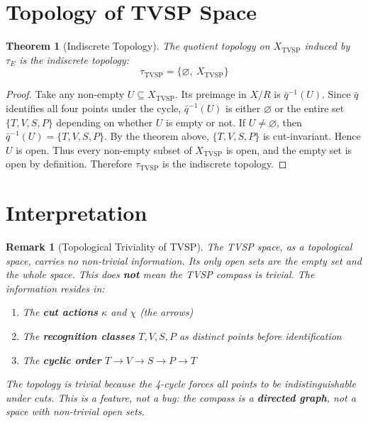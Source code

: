 \documentclass[12pt]{article}
\newtheorem{theorem}[axiom]{Theorem}
\newtheorem{remark}[axiom]{Remark}
\begin{document}
\section{Topology of TVSP Space}

\begin{theorem}[Indiscrete Topology]
The quotient topology on \(X_{\text{TVSP}}\) induced by \(\tau_E\) is the indiscrete topology:
\[
\tau_{\text{TVSP}} = \{ \varnothing,\ X_{\text{TVSP}} \}
\]
\end{theorem}

\begin{proof}
Take any non-empty \(U \subseteq X_{\text{TVSP}}\). Its preimage in \(X/R\) is \(\bar{q}^{-1}(U)\). Since \(\bar{q}\) identifies all four points under the cycle, \(\bar{q}^{-1}(U)\) is either \(\varnothing\) or the entire set \(\{T, V, S, P\}\) depending on whether \(U\) is empty or not.
If \(U \neq \varnothing\), then \(\bar{q}^{-1}(U) = \{T, V, S, P\}\).
By the theorem above, \(\{T, V, S, P\}\) is cut-invariant.
Hence \(U\) is open.
Thus every non-empty subset of \(X_{\text{TVSP}}\) is open, and the empty set is open by definition.
Therefore \(\tau_{\text{TVSP}}\) is the indiscrete topology.
\end{proof}

\section{Interpretation}

\begin{remark}[Topological Triviality of TVSP]
The TVSP space, as a topological space, carries no non-trivial information. Its only open sets are the empty set and the whole space.
This does \textbf{not} mean the TVSP compass is trivial. The information resides in:
\begin{enumerate}
    \item The \textbf{cut actions} \(\kappa\) and \(\chi\) (the arrows)
    \item The \textbf{recognition classes} \(T, V, S, P\) as distinct points before identification
    \item The \textbf{cyclic order} \(T \to V \to S \to P \to T\)
\end{enumerate}
The topology is trivial because the 4-cycle forces all points to be indistinguishable under cuts. This is a feature, not a bug: the compass is a \textbf{directed graph}, not a space with non-trivial open sets.
\end{remark}
\end{document}
